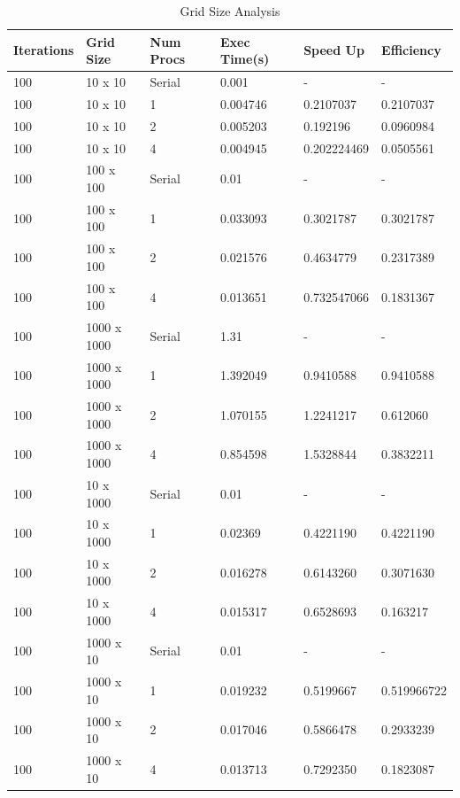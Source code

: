 \documentclass[12pt, letterpaper]{report}
\begin{document}
\begin{table}[H]
	\centering
	\begin{tabular}{ |l|l|l|l|l|l| }
		\hline
		\textbf{Iterations} & \textbf{Grid Size} & \textbf{Num Procs} & \textbf{Exec Time(s)} & \textbf{Speed Up} & \textbf{Efficiency} \\
		\hline \hline \hline
		100 & 10 x 10 & Serial & 0.001 & - & - \\
		\hline
		100 & 10 x 10 & 1 & 0.004746 & 0.2107037 & 0.2107037 \\
		\hline
		100 & 10 x 10 & 2 & 0.005203 & 0.192196 & 0.0960984 \\
		\hline
		100 & 10 x 10 & 4 & 0.004945 & 0.202224469 & 0.0505561 \\
		\hline \hline \hline
		100 & 100 x 100 & Serial & 0.01 & - & - \\
		\hline
		100 & 100 x 100 & 1 & 0.033093 &  0.3021787 & 0.3021787 \\
		\hline
		100 & 100 x 100 & 2 & 0.021576 & 0.4634779 & 0.2317389 \\
		\hline
		100 & 100 x 100 & 4 & 0.013651 & 0.732547066 & 0.1831367 \\
		\hline \hline \hline
		100 & 1000 x 1000 & Serial & 1.31 & - & - \\
		\hline
		100 & 1000 x 1000 & 1 & 1.392049 & 0.9410588 & 0.9410588 \\
		\hline
		100 & 1000 x 1000 & 2 & 1.070155 & 1.2241217 & 0.612060 \\
		\hline
		100 & 1000 x 1000 & 4 & 0.854598 & 1.5328844 & 0.3832211 \\
		\hline \hline \hline
		100 & 10 x 1000 & Serial & 0.01 & - & - \\
		\hline
		100 & 10 x 1000 & 1 & 0.02369 & 0.4221190 & 0.4221190 \\
		\hline
		100 & 10 x 1000 & 2 & 0.016278 & 0.6143260 & 0.3071630 \\
		\hline
		100 & 10 x 1000 & 4 & 0.015317 & 0.6528693 & 0.163217 \\
		\hline \hline \hline
		100 & 1000 x 10 & Serial & 0.01 & - & - \\
		\hline
		100 & 1000 x 10 & 1 & 0.019232 & 0.5199667 & 0.519966722 \\
		\hline
		100 & 1000 x 10 & 2 & 0.017046 & 0.5866478 & 0.2933239 \\
		\hline
		100 & 1000 x 10 & 4 & 0.013713 & 0.7292350 & 0.1823087 \\
		\hline
	\end{tabular}
	\caption{Grid Size Analysis}
\end{table}
\end{document}
